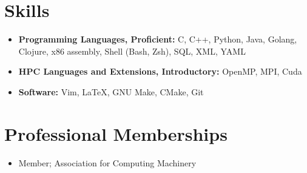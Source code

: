 \documentclass[11pt,letterpaper,sans]{moderncv}
\begin{document}
\section{Skills}

\vspace{3pt}

\begin{itemize}

	\item{
		\textbf{Programming Languages, Proficient:}
		C, C++, Python, Java, Golang, Clojure, x86 assembly, Shell (Bash, Zsh),
		SQL, XML, YAML
	}
	\vspace{3pt}
	\item{
		\textbf{HPC Languages and Extensions, Introductory:}
		OpenMP, MPI, Cuda
	}
	\item{
		\textbf{Software:}
		Vim, \LaTeX, GNU Make, CMake, Git
	}

\end{itemize}

\section{Professional Memberships}
\begin{itemize}
	\item {
			Member; Association for Computing Machinery
	}
\end{itemize}
\end{document}
